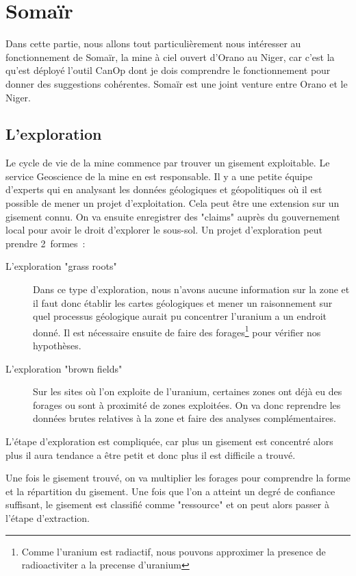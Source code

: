 

\section{Somaïr}
Dans cette partie, nous allons tout particulièrement nous intéresser au fonctionnement de Somaïr, la mine à ciel ouvert d'Orano au Niger, car c'est la qu'est déployé l'outil CanOp dont je dois comprendre le fonctionnement pour donner des suggestions cohérentes. Somaïr est une joint venture entre Orano et le Niger.
\subsection{L'exploration}

Le cycle de vie de la mine commence par trouver un gisement exploitable. Le service Geoscience de la mine en est responsable. Il y a une petite équipe d'experts qui en analysant les données géologiques et géopolitiques où il est possible de mener un projet d'exploitation. Cela peut être une extension sur un gisement connu. On va ensuite enregistrer des "claims" auprès du gouvernement local pour avoir le droit d'explorer le sous-sol. Un projet d'exploration peut prendre 2~formes~:
\begin{description}
    \item[L'exploration "grass roots"] Dans ce type d'exploration, nous n’avons aucune information sur la zone et il faut donc établir les cartes géologiques et mener un raisonnement sur quel processus géologique aurait pu concentrer l'uranium a un endroit donné. Il est nécessaire ensuite de faire des forages\footnote{Comme l'uranium est radiactif, nous pouvons approximer la presence de radioactiviter a la precense d'uranium} pour vérifier nos hypothèses. %
    \item[L'exploration "brown fields"] Sur les sites où l'on exploite de l'uranium, certaines zones ont déjà eu des forages ou sont à proximité de zones exploitées. On va donc reprendre les données brutes relatives à la zone et faire des analyses complémentaires.
\end{description}
L'étape d'exploration est compliquée, car plus un gisement est concentré alors plus il aura tendance a être petit et donc plus il est difficile a trouvé.

Une fois le gisement trouvé, on va multiplier les forages pour comprendre la forme et la répartition du gisement. Une fois que l'on a atteint un degré de confiance suffisant, le gisement est classifié comme "ressource" et on peut alors passer à l’étape d'extraction.








